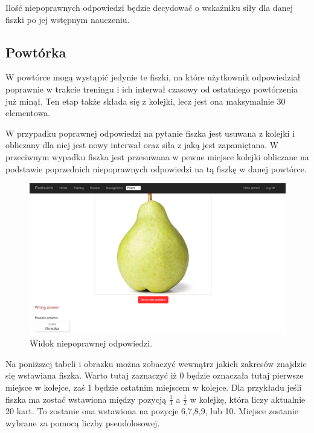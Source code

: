 Ilość niepoprawnych odpowiedzi będzie decydować o wskaźniku siły dla danej fiszki po jej wstępnym nauczeniu.

\subsection{Powtórka}
\label{sub:powtorka}
W powtórce mogą wystąpić jedynie te fiszki, na które użytkownik odpowiedział poprawnie w trakcie treningu i ich interwał czasowy od ostatniego powtórzenia już minął. Ten etap także składa się z kolejki, lecz jest ona maksymalnie 30 elementowa. 

W przypadku poprawnej odpowiedzi na pytanie fiszka jest usuwana z kolejki i obliczany dla niej jest nowy interwał oraz siła z jaką jest zapamiętana. W przeciwnym wypadku fiszka jest przesuwana w pewne miejsce kolejki obliczane na podstawie poprzednich niepoprawnych odpowiedzi na tą fiszkę w danej powtórce. 

\begin{figure}[h]
	\centering
	\includegraphics[width=\textwidth]{images/wrongAnswer.png}
	 \caption{Widok niepoprawnej odpowiedzi.}
\end{figure}

Na poniższej tabeli i obrazku można zobaczyć wewnątrz jakich zakresów znajdzie się wstawiana fiszka. Warto tutaj zaznaczyć iż 0 będzie oznaczała tutaj pierwsze miejsce w kolejce, zaś 1 będzie ostatnim miejscem w kolejce.
Dla przykładu jeśli fiszka ma zostać wstawiona między pozycją $\frac{1}{3}$ a $\frac{1}{2}$ w kolejkę, która liczy aktualnie 20 kart. To zostanie ona wstawiona na pozycje 6,7,8,9, lub 10. Miejsce zostanie wybrane za pomocą liczby pseudolosowej.





